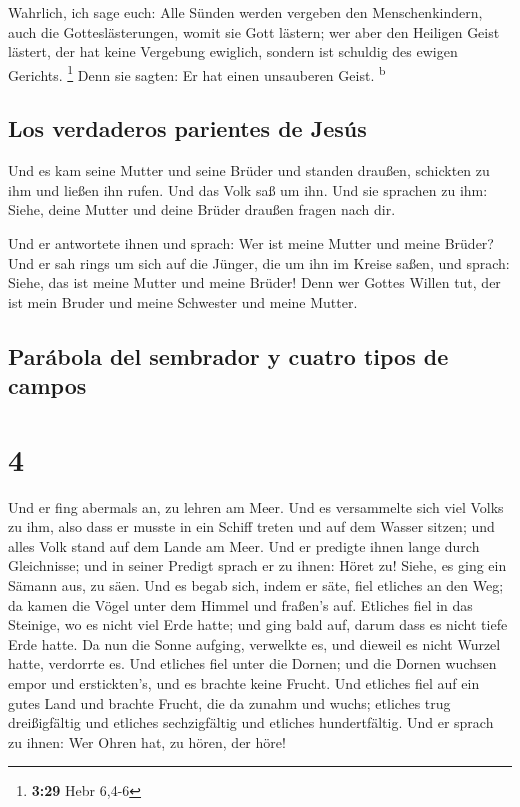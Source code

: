  Wahrlich, ich sage euch: Alle Sünden werden vergeben den
Menschenkindern, auch die Gotteslästerungen, womit sie Gott lästern;
 wer aber den Heiligen Geist lästert, der hat keine
Vergebung ewiglich, sondern ist schuldig des ewigen Gerichts.
\footnote{\textbf{3:29} Hebr 6,4-6}  Denn sie sagten: Er
hat einen unsauberen Geist. \textsuperscript{b}

\hypertarget{los-verdaderos-parientes-de-jesuxfas}{%
\subsection{Los verdaderos parientes de
Jesús}\label{los-verdaderos-parientes-de-jesuxfas}}

 Und es kam seine Mutter und seine Brüder und standen
draußen, schickten zu ihm und ließen ihn rufen.  Und das
Volk saß um ihn. Und sie sprachen zu ihm: Siehe, deine Mutter und deine
Brüder draußen fragen nach dir.

 Und er antwortete ihnen und sprach: Wer ist meine Mutter
und meine Brüder?  Und er sah rings um sich auf die
Jünger, die um ihn im Kreise saßen, und sprach: Siehe, das ist meine
Mutter und meine Brüder!  Denn wer Gottes Willen tut, der
ist mein Bruder und meine Schwester und meine Mutter.

\hypertarget{paruxe1bola-del-sembrador-y-cuatro-tipos-de-campos}{%
\subsection{Parábola del sembrador y cuatro tipos de
campos}\label{paruxe1bola-del-sembrador-y-cuatro-tipos-de-campos}}

\hypertarget{section-3}{%
\section{4}\label{section-3}}

 Und er fing abermals an, zu lehren am Meer. Und es
versammelte sich viel Volks zu ihm, also dass er musste in ein Schiff
treten und auf dem Wasser sitzen; und alles Volk stand auf dem Lande am
Meer.  Und er predigte ihnen lange durch Gleichnisse; und
in seiner Predigt sprach er zu ihnen:  Höret zu! Siehe, es
ging ein Sämann aus, zu säen.  Und es begab sich, indem er
säte, fiel etliches an den Weg; da kamen die Vögel unter dem Himmel und
fraßen's auf.  Etliches fiel in das Steinige, wo es nicht
viel Erde hatte; und ging bald auf, darum dass es nicht tiefe Erde
hatte.  Da nun die Sonne aufging, verwelkte es, und
dieweil es nicht Wurzel hatte, verdorrte es.  Und etliches
fiel unter die Dornen; und die Dornen wuchsen empor und erstickten's,
und es brachte keine Frucht.  Und etliches fiel auf ein
gutes Land und brachte Frucht, die da zunahm und wuchs; etliches trug
dreißigfältig und etliches sechzigfältig und etliches hundertfältig.
 Und er sprach zu ihnen: Wer Ohren hat, zu hören, der
höre!

